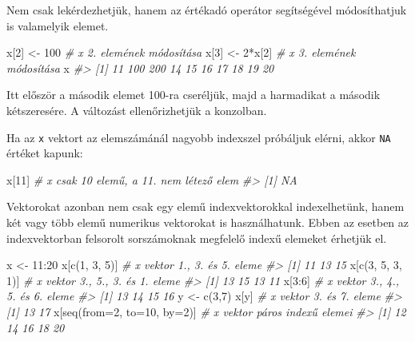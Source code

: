 \documentclass[
]{book}
\newenvironment{Shaded}{\begin{snugshade}}{\end{snugshade}}
\newcommand{\AttributeTok}[1]{\textcolor[rgb]{0.77,0.63,0.00}{#1}}
\newcommand{\CommentTok}[1]{\textcolor[rgb]{0.56,0.35,0.01}{\textit{#1}}}
\newcommand{\DecValTok}[1]{\textcolor[rgb]{0.00,0.00,0.81}{#1}}
\newcommand{\FunctionTok}[1]{\textcolor[rgb]{0.00,0.00,0.00}{#1}}
\newcommand{\NormalTok}[1]{#1}
\newcommand{\OtherTok}[1]{\textcolor[rgb]{0.56,0.35,0.01}{#1}}
\newcommand{\SpecialCharTok}[1]{\textcolor[rgb]{0.00,0.00,0.00}{#1}}
\begin{document}
Nem csak lekérdezhetjük, hanem az értékadó operátor segítségével módosíthatjuk is valamelyik elemet.

\begin{Shaded}
\begin{Highlighting}[]
\NormalTok{x[}\DecValTok{2}\NormalTok{] }\OtherTok{\textless{}{-}} \DecValTok{100}       \CommentTok{\# x 2. elemének módosítása}
\NormalTok{x[}\DecValTok{3}\NormalTok{] }\OtherTok{\textless{}{-}} \DecValTok{2}\SpecialCharTok{*}\NormalTok{x[}\DecValTok{2}\NormalTok{]    }\CommentTok{\# x 3. elemének módosítása}
\NormalTok{x}
\CommentTok{\#\textgreater{}  [1]  11 100 200  14  15  16  17  18  19  20}
\end{Highlighting}
\end{Shaded}

Itt először a második elemet 100-ra cseréljük, majd a harmadikat a második kétszeresére. A változást ellenőrizhetjük a konzolban.

Ha az \texttt{x} vektort az elemszámánál nagyobb indexszel próbáljuk elérni, akkor \texttt{NA} értéket kapunk:

\begin{Shaded}
\begin{Highlighting}[]
\NormalTok{x[}\DecValTok{11}\NormalTok{]     }\CommentTok{\# x csak 10 elemű, a 11. nem létező elem}
\CommentTok{\#\textgreater{} [1] NA}
\end{Highlighting}
\end{Shaded}

Vektorokat azonban nem csak egy elemű indexvektorokkal indexelhetünk, hanem két vagy több elemű numerikus vektorokat is használhatunk. Ebben az esetben az indexvektorban felsorolt sorszámoknak megfelelő indexű elemeket érhetjük el.

\begin{Shaded}
\begin{Highlighting}[]
\NormalTok{x }\OtherTok{\textless{}{-}} \DecValTok{11}\SpecialCharTok{:}\DecValTok{20} 
\NormalTok{x[}\FunctionTok{c}\NormalTok{(}\DecValTok{1}\NormalTok{, }\DecValTok{3}\NormalTok{, }\DecValTok{5}\NormalTok{)]               }\CommentTok{\# x vektor 1., 3. és 5. eleme}
\CommentTok{\#\textgreater{} [1] 11 13 15}
\NormalTok{x[}\FunctionTok{c}\NormalTok{(}\DecValTok{3}\NormalTok{, }\DecValTok{5}\NormalTok{, }\DecValTok{3}\NormalTok{, }\DecValTok{1}\NormalTok{)]            }\CommentTok{\# x vektor 3., 5., 3. és 1. eleme}
\CommentTok{\#\textgreater{} [1] 13 15 13 11}
\NormalTok{x[}\DecValTok{3}\SpecialCharTok{:}\DecValTok{6}\NormalTok{]                      }\CommentTok{\# x vektor 3., 4., 5. és 6. eleme}
\CommentTok{\#\textgreater{} [1] 13 14 15 16}
\NormalTok{y }\OtherTok{\textless{}{-}} \FunctionTok{c}\NormalTok{(}\DecValTok{3}\NormalTok{,}\DecValTok{7}\NormalTok{)}
\NormalTok{x[y]                        }\CommentTok{\# x vektor 3. és 7. eleme}
\CommentTok{\#\textgreater{} [1] 13 17}
\NormalTok{x[}\FunctionTok{seq}\NormalTok{(}\AttributeTok{from=}\DecValTok{2}\NormalTok{, }\AttributeTok{to=}\DecValTok{10}\NormalTok{, }\AttributeTok{by=}\DecValTok{2}\NormalTok{)] }\CommentTok{\# x vektor páros indexű elemei  }
\CommentTok{\#\textgreater{} [1] 12 14 16 18 20}
\end{Highlighting}
\end{Shaded}
\end{document}
